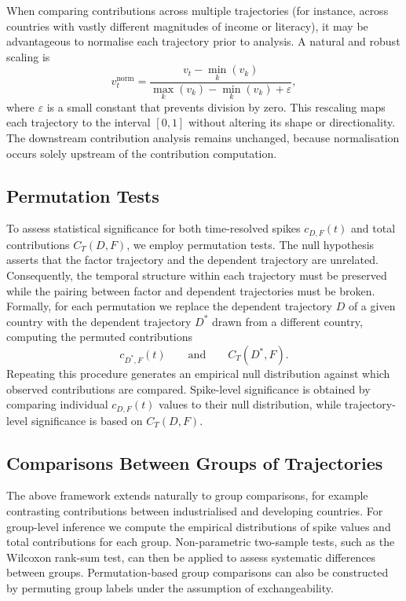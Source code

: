         When comparing contributions across multiple trajectories (for instance, across countries with vastly different magnitudes of income or literacy), it may be advantageous to normalise each trajectory prior to analysis. A natural and robust scaling is
        \[
            v_t^{\text{norm}} =
            \frac{v_t - \min_{k}(v_k)}{\max_{k}(v_k) - \min_{k}(v_k) + \varepsilon},
        \]
        where $\varepsilon$ is a small constant that prevents division by zero. This rescaling maps each trajectory to the interval $[0,1]$ without altering its shape or directionality. The downstream contribution analysis remains unchanged, because normalisation occurs solely upstream of the contribution computation.

    \subsection{Permutation Tests}

        To assess statistical significance for both time-resolved spikes $c_{D,F}(t)$ and total contributions $C_T(D,F)$, we employ permutation tests. The null hypothesis asserts that the factor trajectory and the dependent trajectory are unrelated. Consequently, the temporal structure within each trajectory must be preserved while the pairing between factor and dependent trajectories must be broken. Formally, for each permutation we replace the dependent trajectory $D$ of a given country with the dependent trajectory $D^{\ast}$ drawn from a different country, computing the permuted contributions
        \[
            c_{D^{\ast},F}(t)
            \qquad\text{and}\qquad
            C_T(D^{\ast},F).
        \]
        Repeating this procedure generates an empirical null distribution against which observed contributions are compared. Spike-level significance is obtained by comparing individual $c_{D,F}(t)$ values to their null distribution, while trajectory-level significance is based on $C_T(D,F)$.

    \subsection{Comparisons Between Groups of Trajectories}

        The above framework extends naturally to group comparisons, for example contrasting contributions between industrialised and developing countries. For group-level inference we compute the empirical distributions of spike values and total contributions for each group. Non-parametric two-sample tests, such as the Wilcoxon rank-sum test, can then be applied to assess systematic differences between groups. Permutation-based group comparisons can also be constructed by permuting group labels under the assumption of exchangeability.

